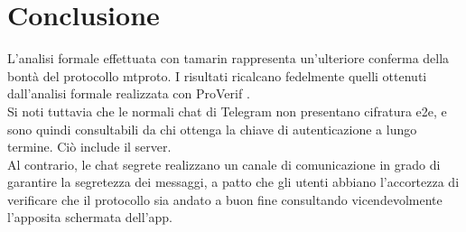 \section{Conclusione}
L'analisi formale effettuata con \gls{tamarin} rappresenta un'ulteriore conferma della bontà del protocollo \gls{mtproto}.
I risultati ricalcano fedelmente quelli ottenuti dall'analisi formale realizzata con ProVerif \cite{book:proverif} \cite{inp:mtproto-proverif}. \\

Si noti tuttavia che le normali chat di Telegram non presentano cifratura \gls{e2e}, e sono quindi consultabili da chi ottenga la chiave di autenticazione
a lungo termine. Ciò include il server. \\
Al contrario, le chat segrete realizzano un canale di comunicazione in grado di garantire la segretezza dei messaggi, a patto che gli utenti abbiano
l'accortezza di verificare che il protocollo sia andato a buon fine consultando vicendevolmente l'apposita schermata dell'app.